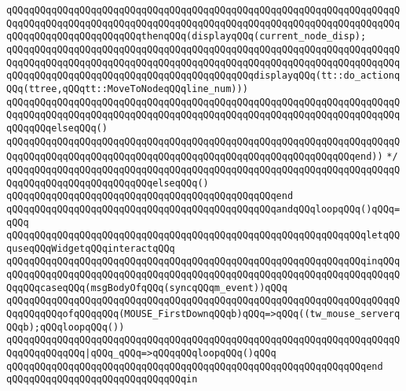\verb|qQQqqQQqqQQqqQQqqQQqqQQqqQQqqQQqqQQqqQQqqQQqqQQqqQQqqQQqqQQqqQQqqQQqqQQqqQQqqQQqqQQqqQQqqQQqqQQqqQQqqQQqqQQqqQQqqQQqqQQqqQQqqQQqqQQqqQQqqQQqqQQqqQQqqQQqqQQqqQQqqQQqthenqQQq(displayqQQq(current_node_disp);|\newline
\verb|qQQqqQQqqQQqqQQqqQQqqQQqqQQqqQQqqQQqqQQqqQQqqQQqqQQqqQQqqQQqqQQqqQQqqQQqqQQqqQQqqQQqqQQqqQQqqQQqqQQqqQQqqQQqqQQqqQQqqQQqqQQqqQQqqQQqqQQqqQQqqQQqqQQqqQQqqQQqqQQqqQQqqQQqqQQqqQQqqQQqqQQqdisplayqQQq(tt::do_actionqQQq(ttree,qQQqtt::MoveToNodeqQQqline_num)))|\newline
\verb|qQQqqQQqqQQqqQQqqQQqqQQqqQQqqQQqqQQqqQQqqQQqqQQqqQQqqQQqqQQqqQQqqQQqqQQqqQQqqQQqqQQqqQQqqQQqqQQqqQQqqQQqqQQqqQQqqQQqqQQqqQQqqQQqqQQqqQQqqQQqqQQqqQQqelseqQQq()|\newline
\verb|qQQqqQQqqQQqqQQqqQQqqQQqqQQqqQQqqQQqqQQqqQQqqQQqqQQqqQQqqQQqqQQqqQQqqQQqqQQqqQQqqQQqqQQqqQQqqQQqqQQqqQQqqQQqqQQqqQQqqQQqqQQqqQQqqQQqend))|\newline
\verb|*/|\newline
\newline
\verb|qQQqqQQqqQQqqQQqqQQqqQQqqQQqqQQqqQQqqQQqqQQqqQQqqQQqqQQqqQQqqQQqqQQqqQQqqQQqqQQqqQQqqQQqqQQqqQQqelseqQQq()|\newline
\verb|qQQqqQQqqQQqqQQqqQQqqQQqqQQqqQQqqQQqqQQqqQQqqQQqend|\newline
\newline
\verb|qQQqqQQqqQQqqQQqqQQqqQQqqQQqqQQqqQQqqQQqqQQqqQQqandqQQqloopqQQq()qQQq=qQQq|\newline
\verb|qQQqqQQqqQQqqQQqqQQqqQQqqQQqqQQqqQQqqQQqqQQqqQQqqQQqqQQqqQQqqQQqletqQQquseqQQqWidgetqQQqinteractqQQq|\newline
\verb|qQQqqQQqqQQqqQQqqQQqqQQqqQQqqQQqqQQqqQQqqQQqqQQqqQQqqQQqqQQqqQQqinqQQq|\newline
\verb|qQQqqQQqqQQqqQQqqQQqqQQqqQQqqQQqqQQqqQQqqQQqqQQqqQQqqQQqqQQqqQQqqQQqqQQqqQQqcaseqQQq(msgBodyOfqQQq(syncqQQqm_event))qQQq|\newline
\verb|qQQqqQQqqQQqqQQqqQQqqQQqqQQqqQQqqQQqqQQqqQQqqQQqqQQqqQQqqQQqqQQqqQQqqQQqqQQqqQQqofqQQqqQQq(MOUSE_FirstDownqQQqb)qQQq=>qQQq((tw_mouse_serverqQQqb);qQQqloopqQQq())|\newline
\verb|qQQqqQQqqQQqqQQqqQQqqQQqqQQqqQQqqQQqqQQqqQQqqQQqqQQqqQQqqQQqqQQqqQQqqQQqqQQqqQQqqQQq|\verb#|qQQq_qQQq=>qQQqqQQqloopqQQq()qQQq#\newline
\verb|qQQqqQQqqQQqqQQqqQQqqQQqqQQqqQQqqQQqqQQqqQQqqQQqqQQqqQQqqQQqqQQqend|\newline
\verb|qQQqqQQqqQQqqQQqqQQqqQQqqQQqqQQqin|\newline
